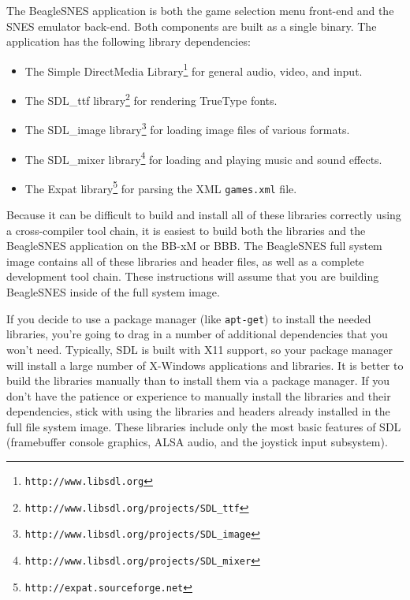 The BeagleSNES application is both the game selection menu front-end and the SNES emulator back-end.  Both components are built as a single binary.  The application has the following library dependencies:

\begin{itemize}
\item The Simple DirectMedia Library\footnote{\texttt{http://www.libsdl.org}} for general audio, video, and input.
\item The SDL\_ttf library\footnote{\texttt{http://www.libsdl.org/projects/SDL\_ttf}} for rendering TrueType fonts.
\item The SDL\_image library\footnote{\texttt{http://www.libsdl.org/projects/SDL\_image}} for loading image files of various formats.
\item The SDL\_mixer library\footnote{\texttt{http://www.libsdl.org/projects/SDL\_mixer}} for loading and playing music and sound effects.
\item The Expat library\footnote{\texttt{http://expat.sourceforge.net}} for parsing the XML \texttt{games.xml} file.
\end{itemize}

\noindent{}Because it can be difficult to build and install all of these libraries correctly using a cross-compiler tool chain, it is easiest to build both the libraries and the BeagleSNES application on the BB-xM or BBB.  The BeagleSNES full system image contains all of these libraries and header files, as well as a complete development tool chain.  These instructions will assume that you are building BeagleSNES inside of the full system image.  

\begin{updateWarn}
If you decide to use a package manager (like \texttt{apt-get}) to install the needed libraries, you're going to drag in a number of additional dependencies that you won't need.  Typically, SDL is built with X11 support, so your package manager will install a large number of X-Windows applications and libraries.  It is better to build the libraries manually than to install them via a package manager.  If you don't have the patience or experience to manually install the libraries and their dependencies, stick with using the libraries and headers already installed in the full file system image.  These libraries include only the most basic features of SDL (framebuffer console graphics, ALSA audio, and the joystick input subsystem).
\end{updateWarn}

